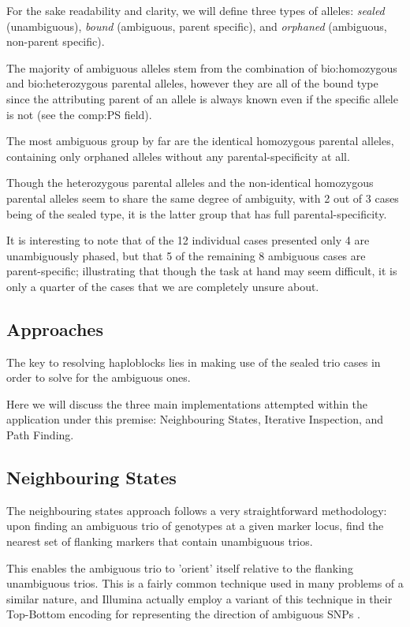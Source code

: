 For the sake readability and clarity, we will define three types of alleles: \textit{sealed} (unambiguous), \textit{bound} (ambiguous, parent specific), and \textit{orphaned} (ambiguous, non-parent specific).

The majority of ambiguous alleles stem from the combination of \gls{bio:homozygous} and \gls{bio:heterozygous} parental alleles, however they are all of the bound type since the attributing parent of an allele is always known even if the specific allele is not (see the \gls{comp:PS} field).

The most ambiguous group by far are the identical homozygous parental alleles, containing only orphaned alleles without any parental-specificity at all.

Though the heterozygous parental alleles and the non-identical homozygous parental alleles seem to share the same degree of ambiguity, with 2 out of 3 cases being of the sealed type, it is the latter group that has full parental-specificity.

It is interesting to note that of the 12 individual cases presented only 4 are unambiguously phased, but that 5 of the remaining 8 ambiguous cases are parent-specific; illustrating that though the task at hand may seem difficult, it is only a quarter of the cases that we are completely unsure about.


\subsection{Approaches}

The key to resolving haploblocks lies in making use of the sealed trio cases in order to solve for the ambiguous ones. 

Here we will discuss the three main implementations attempted within the application under this premise: Neighbouring States, Iterative Inspection, and Path Finding.

\subsection{Neighbouring States}

The neighbouring states approach follows a very straightforward methodology: upon finding an ambiguous trio of genotypes at a given marker locus, find the nearest set of flanking markers that contain unambiguous trios.

This enables the ambiguous trio to 'orient' itself relative to the flanking unambiguous trios.  This is a fairly common technique used in many problems of a similar nature, and Illumina actually employ a variant of this technique in their Top-Bottom encoding for representing the direction of ambiguous SNPs \cite{illuminatopbot}.

